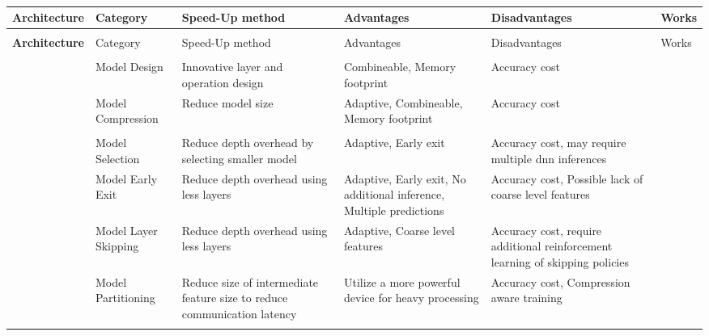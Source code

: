 \small{
\begin{longtabu}{>{\bfseries}X|X[c]|X[c]|X[c]|X[c]|X[c]}
	\caption[]{} \label{tbl:fast-inference} \\
	\toprule
	\rowfont{\bfseries}
	Architecture & Category & Speed-Up method & Advantages & Disadvantages & Works \tabularnewline
	\hline
	\endfirsthead
	\\
	\toprule
	\rowfont{\bfseries}
	Architecture & Category & Speed-Up method & Advantages & Disadvantages & Works \tabularnewline
	\hline
	\endhead %
	\hline
	\\
	\endfoot
	\hline
	\endlastfoot

	 & Model Design & Innovative layer and operation design & Combineable, Memory footprint  & Accuracy cost & \cite{iandola_squeezenet:_2016,howard_mobilenets:_2017,sandler_mobilenetv2:_2018, zhang_shufflenet:_2017, ma_shufflenet_2018} \tabularnewline
	
	& Model Compression & Reduce model size & Adaptive, Combineable, Memory footprint & Accuracy cost &  \cite{hinton_distilling_2015,courbariaux_binaryconnect:_2015,courbariaux_binarized_2016,romero_fitnets:_2014} \tabularnewline	
	& & & & & \tabularnewline
	
	& Model Selection & Reduce depth overhead by selecting smaller model & Adaptive, Early exit & Accuracy cost, may require multiple \gls{dnn} inferences & \cite{bolukbasi_adaptive_2017, park_big/little_2015} \tabularnewline
	
	& Model Early Exit & Reduce depth overhead using less layers & Adaptive, Early exit, No additional inference, Multiple predictions & Accuracy cost, Possible lack of coarse level features & \cite{leroux_resource-constrained_2015,teerapittayanon_branchynet:_2016, berestizshevsky_sacrificing_2019, kaya_shallow-deep_nodate, huang_multi-scale_2017} \tabularnewline
	& Model Layer Skipping & Reduce depth overhead using less layers & Adaptive, Coarse level features & Accuracy cost, require additional reinforcement learning of skipping policies & \cite{wang_skipnet:_2017,wu_blockdrop:_2017} \tabularnewline
	\hline
	 & Model Partitioning & Reduce size of intermediate feature size to reduce communication latency & Utilize a more powerful device for heavy processing  & Accuracy cost, Compression aware training & \cite{kang_neurosurgeon:_2017,choi_near-lossless_2018, choi_deep_2018, eshratifar_bottlenet:_2019} \tabularnewline
	

\end{longtabu}}
